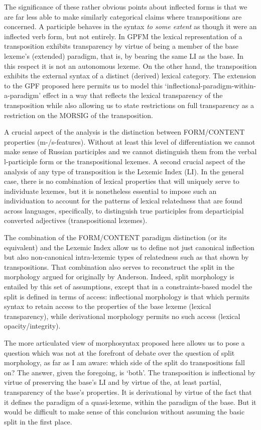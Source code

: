 \documentclass[output=paper,
modfonts
]{LSP/langsci}
\begin{document}
The significance of these rather obvious points about inflected forms is that we are far less able to make similarly categorical claims where transpositions are concerned. A participle behaves in the syntax \emph{to some extent} as though it were an inflected verb form, but not entirely. In GPFM the lexical representation of a transposition exhibits transparency by virtue of being a member of the base lexeme’s (extended) paradigm, that is, by bearing the same LI as the base. In this respect it is not an autonomous lexeme. On the other hand, the transposition exhibits the external syntax of a distinct (derived) lexical category. The extension to the GPF proposed here permits us to model this ‘inflectional-paradigm-within-a-paradigm’ effect in a way that reflects the lexical transparency of the transposition while also allowing us to state restrictions on full transparency as a restriction on the MORSIG of the transposition. 

A crucial aspect of the analysis is the distinction between FORM/CONTENT properties (m-/s-features). %
Without at  least this level of differentiation we cannot make sense of Russian participles and we cannot distinguish them from the verbal l-participle form or the transpositional lexemes.  A second crucial aspect of the analysis of any type of transposition is the Lexemic Index (LI). In the general case, there is no combination of lexical properties that will uniquely serve to individuate lexemes, but it is nonetheless essential to impose such an individuation to account for the patterns of lexical relatedness that are found across languages, specifically, to distinguish true participles from departicipial converted adjectives (transpositional lexemes). 

The combination of the FORM/CONTENT paradigm distinction (or its equivalent) and the Lexemic Index allow us to define not just canonical inflection but also non-canonical intra-lexemic types of relatedness such as that shown by transpositions. That combination also serves to reconstruct the split in the morphology argued for originally by Anderson. Indeed, split morphology is entailed by this set of assumptions, except that in a constraints-based model the split is defined in terms of access: inflectional morphology is that which permits syntax to retain access to the properties of the base lexeme (lexical transparency), while derivational morphology permits no such access (lexical opacity/integrity).   

The more articulated view of morphosyntax proposed here allows us to pose a question which was not at the forefront of debate over the question of split morphology, as far as I am aware: which side of the split do transpositions fall on? The answer, given the foregoing, is ‘both’. The transposition is inflectional by virtue of preserving the base’s LI and by virtue of the, at least partial, transparency of the base’s properties. It is derivational by virtue of the fact that it defines the paradigm of a quasi-lexeme, within the paradigm of the base. But it would be difficult to make sense of this conclusion without assuming the basic split in the first place.
\end{document}
